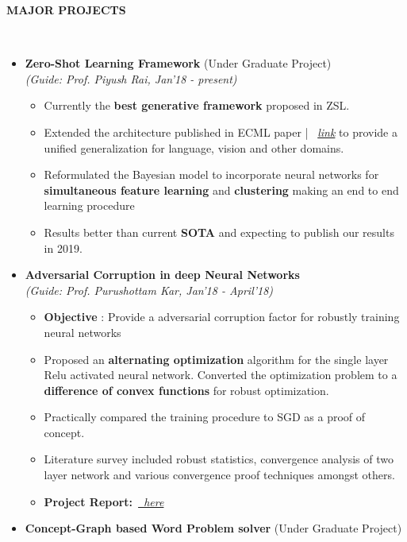 \documentclass[a4paper,10pt]{article}
\newcommand{\isep}{-2 pt}
\newcommand{\lsep}{-0.5cm}
\newcommand{\resheading}[1]{{\small \colorbox{mygrey}{\begin{minipage}{0.975\textwidth}{\textbf{#1 \vphantom{p\^{E}}}}\end{minipage}}}}
\begin{document}
\resheading{\textbf{MAJOR PROJECTS} }\\[\lsep]

\begin{itemize}
\item \textbf{Zero-Shot Learning Framework} (Under Graduate Project)\\
 \emph{(Guide: Prof. Piyush Rai, Jan'18 - present)} \\[-0.6cm]
	\begin{itemize}\itemsep \isep
	\item Currently the \textbf{best generative framework} proposed in ZSL.
	\item Extended the architecture published in ECML paper | \faGlobe \ \href{https://arxiv.org/pdf/1711.05820.pdf}{\textit{link}} to provide a unified generalization for language, vision and other domains.
	\item Reformulated the Bayesian model to incorporate neural networks for \textbf{simultaneous feature learning} and \textbf{clustering} making an end to end learning procedure
    \item Results better than current \textbf{SOTA} and expecting to publish our results in 2019.
	\end{itemize}
\item \textbf{Adversarial Corruption in deep Neural Networks} \\
 \emph{(Guide: Prof. Purushottam Kar, Jan'18 - April'18)} \\[-0.6cm]
	\begin{itemize}\itemsep \isep
	\item \textbf{Objective} : Provide a adversarial corruption factor for robustly training neural networks
	\item Proposed an \textbf{alternating optimization} algorithm for the single layer Relu activated neural network. Converted the optimization problem to a \textbf{difference of convex functions} for robust optimization.
	\item Practically compared the training procedure to SGD as a proof of concept.
	\item Literature survey included robust statistics, convergence analysis of two layer network and various convergence proof techniques amongst others.
	\item \textbf{Project Report:}\ \href{http://home.iitk.ac.in/~varun/CS777.pdf}{\textit{\faGlobe \ here}}
	\end{itemize}
\item \textbf{Concept-Graph based Word Problem solver} (Under Graduate Project) \\

\end{itemize}
\end{document}
